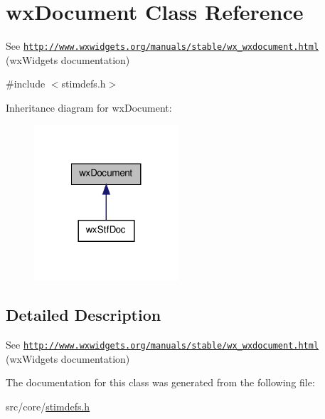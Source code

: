 \hypertarget{classwxDocument}{
\section{wxDocument Class Reference}
\label{classwxDocument}
}


See \href{http://www.wxwidgets.org/manuals/stable/wx_wxdocument.html}{\tt http://www.wxwidgets.org/manuals/stable/wx\_\-wxdocument.html} (wxWidgets documentation)  




{\ttfamily \#include $<$stimdefs.h$>$}



Inheritance diagram for wxDocument:
\nopagebreak
\begin{figure}[H]
\begin{center}
\leavevmode
\includegraphics[width=152pt]{classwxDocument__inherit__graph}
\end{center}
\end{figure}


\subsection{Detailed Description}
See \href{http://www.wxwidgets.org/manuals/stable/wx_wxdocument.html}{\tt http://www.wxwidgets.org/manuals/stable/wx\_\-wxdocument.html} (wxWidgets documentation) 

The documentation for this class was generated from the following file:\begin{DoxyCompactItemize}
\item 
src/core/\hyperlink{stimdefs_8h}{stimdefs.h}\end{DoxyCompactItemize}
